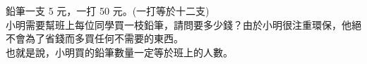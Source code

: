 鉛筆一支 5 元，一打 50 元。(一打等於十二支)\\
小明需要幫班上每位同學買一枝鉛筆，請問要多少錢？由於小明很注重環保，他絕不會為了省錢而多買任何不需要的東西。\\
也就是說，小明買的鉛筆數量一定等於班上的人數。\\
